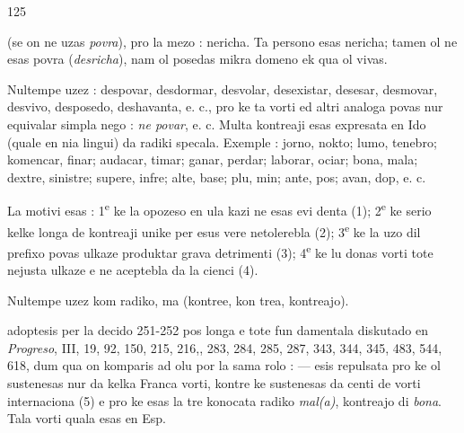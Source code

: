 \begin{VUpage}[129]{125}

\VUcontinue
(se on ne uzas \textit{povra}), pro la mezo : nericha. Ta persono\nl
esas nericha; tamen ol ne esas povra (\textit{desricha}), nam ol\nl
posedas mikra domeno ek qua ol vivas.

Nultempe uzez : despovar, desdormar, desvolar, desexistar,\nl
desesar, desmovar, desvivo, desposedo, deshavanta, e. c., pro\nl
ke ta vorti ed altri analoga povas nur equivalar simpla\nl
nego : \textit{ne povar}, e. c. Multa kontreaji esas expresata en Ido\nl
(quale en nia lingui) da radiki specala. Exemple : jorno,\nl
nokto; lumo, tenebro; komencar, finar; audacar, timar;\nl
ganar, perdar; laborar, ociar; bona, mala; dextre, sinistre;\nl
supere, infre; alte, base; plu, min; ante, pos; avan, dop, e. c.\parplein

La motivi esas : 1\textsuperscript{e} ke la opozeso en ula kazi ne esas evi\cc
denta (1); 2\textsuperscript{e} ke serio kelke longa de kontreaji unike per\nl
{} esus vere netolerebla (2); 3\textsuperscript{e} ke la uzo dil prefixo \nl
povas ulkaze produktar grava detrimenti (3); 4\textsuperscript{e} ke lu donas\nl
vorti tote nejusta ulkaze e ne aceptebla da la cienci (4).\parplein

Nultempe uzez  kom radiko, ma  (kontree, kon\cc
trea, kontreajo).

 adoptesis per la decido 251-252 pos longa e tote fun\cc
damentala diskutado en \textit{Progreso}, III, 19, 92, 150, 215, 216,, 283, 284, 285, 287, 343, 344, 345, 483, 544, 618,\nl
dum qua on komparis ad olu por la sama rolo : \nl
{} ---  esis repulsata pro ke ol sustenesas nur da kelka\nl
Franca vorti, kontre ke  sustenesas da centi de vorti\nl
internaciona (5) e pro ke  esas la tre konocata radiko\nl
\textit{mal(a)}, kontreajo di \textit{bona}. Tala vorti quala esas en Esp.
\end{VUpage}

